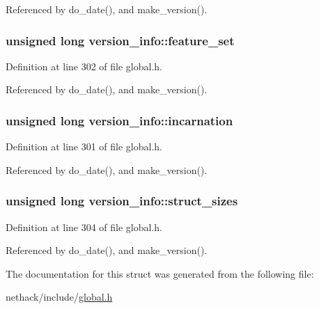 Referenced by do\+\_\+date(), and make\+\_\+version().

\hypertarget{structversion__info_a30b026e5e6a7d440c7e94cdc79d19d1c}{
\subsubsection[{feature\+\_\+set}]{\setlength{\rightskip}{0pt plus 5cm}unsigned long version\+\_\+info\+::feature\+\_\+set}}\label{structversion__info_a30b026e5e6a7d440c7e94cdc79d19d1c}


Definition at line 302 of file global.\+h.



Referenced by do\+\_\+date(), and make\+\_\+version().

\hypertarget{structversion__info_a3cd43ee1186d0ba5175b3741fee41a22}{
\subsubsection[{incarnation}]{\setlength{\rightskip}{0pt plus 5cm}unsigned long version\+\_\+info\+::incarnation}}\label{structversion__info_a3cd43ee1186d0ba5175b3741fee41a22}


Definition at line 301 of file global.\+h.



Referenced by do\+\_\+date(), and make\+\_\+version().

\hypertarget{structversion__info_acefd1dc1f2fcfb2d0a7ece599eeb8627}{
\subsubsection[{struct\+\_\+sizes}]{\setlength{\rightskip}{0pt plus 5cm}unsigned long version\+\_\+info\+::struct\+\_\+sizes}}\label{structversion__info_acefd1dc1f2fcfb2d0a7ece599eeb8627}


Definition at line 304 of file global.\+h.



Referenced by do\+\_\+date(), and make\+\_\+version().



The documentation for this struct was generated from the following file\+:\begin{DoxyCompactItemize}
\item 
nethack/include/\hyperlink{global_8h}{global.\+h}\end{DoxyCompactItemize}
